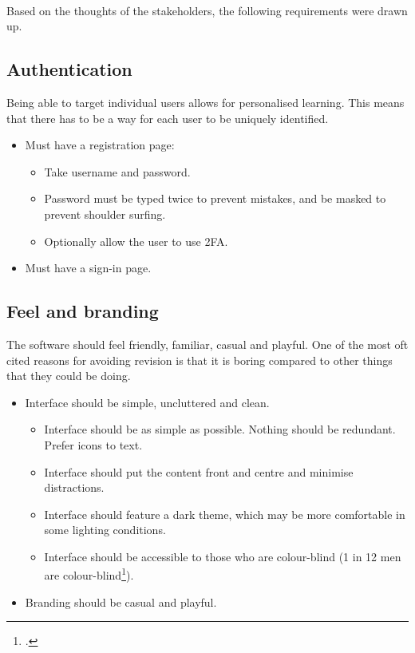 \documentclass{report}
\begin{document}
\paragraph{}
Based on the thoughts of the stakeholders, the following requirements were drawn up.

\subsection{Authentication}
Being able to target individual users allows for personalised learning. This means that there has to be a way for each user to be uniquely identified.
\begin{itemize}
  \item Must have a registration page:
  \begin{itemize}
    \item Take username and password.
    \item Password must be typed twice to prevent mistakes, and be masked to prevent shoulder surfing.
    \item Optionally allow the user to use 2FA.
  \end{itemize}
  \item Must have a sign-in page.
\end{itemize}

\subsection{Feel and branding}
The software should feel friendly, familiar, casual and playful. One of the most oft cited reasons for avoiding revision is that it is boring compared to other things that they could be doing.
\begin{itemize}
  \item Interface should be simple, uncluttered and clean.
  \begin{itemize}
    \item Interface should be as simple as possible. Nothing should be redundant. Prefer icons to text.
    \item Interface should put the content front and centre and minimise distractions.
    \item Interface should feature a dark theme, which may be more comfortable in some lighting conditions.
    \item Interface should be accessible to those who are colour-blind (1 in 12 men are colour-blind\footcite{Colourblindness}).
  \end{itemize}
  \item Branding should be casual and playful.
\end{itemize}
\end{document}
